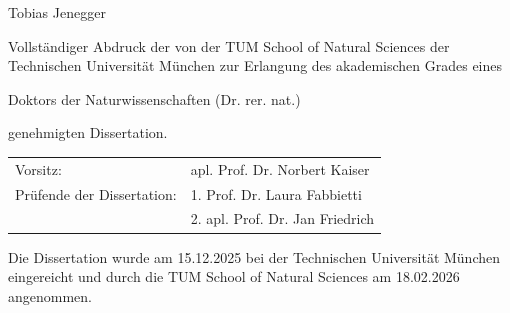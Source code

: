 \documentclass[12pt,twoside]{article} %
\begin{document}
\begin{titlepage}
{  %
  
  {Tobias Jenegger}
  
  \vspace*{2\baselineskip} %

	Vollst\"andiger Abdruck der von der TUM School of Natural Sciences der Technischen
	Universit\"at M\"unchen zur Erlangung des akademischen Grades eines

	\vspace*{2ex}
	Doktors der Naturwissenschaften (Dr. rer. nat.)
	\vspace*{2ex}

	genehmigten Dissertation.

  \vspace*{\fill}

% 
% 
% 

  	\begin{tabularx}{1.0\textwidth}{XX}
	Vorsitz:	& apl. Prof. Dr. Norbert Kaiser \\
	Pr\"ufende der Dissertation:	&	1. Prof. Dr. Laura Fabbietti \\
							        &	2. apl. Prof. Dr. Jan Friedrich \\
							
	\end{tabularx}


	\vspace*{\fill}

	Die Dissertation wurde am 15.12.2025 bei der Technischen Universit\"at M\"unchen
	eingereicht und durch die TUM School of Natural Sciences am 18.02.2026 angenommen.

  \vspace*{\fill}

  \null
  \vfill

}
\end{titlepage}
\end{document}
